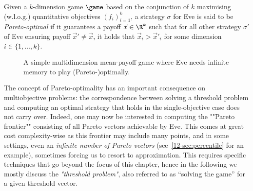 \begin{definition}
Given a $k$-dimension game $\game$ based on the conjunction of $k$ maximising (w.l.o.g.) quantitative objectives $(f_i)_{i=1}^{k}$, a strategy $\sigma$ for Eve is said to be \emph{Pareto-optimal} if it guarantees a payoff $\vec{x} \in \R^k$ such that for all other strategy $\sigma'$ of Eve ensuring payoff $\vec{x}' \neq \vec{x}$, it holds that $\vec{x}_i > \vec{x}'_i$ for some dimension $i \in \{1, \ldots, k\}$.
\end{definition}
 
  
\begin{figure}[tbp]
  \centering
  \caption{A simple multidimension mean-payoff game where Eve needs infinite memory to play (Pareto-)optimally.}
  \label{12-fig:MultiMP}
\end{figure}

The concept of Pareto-optimality has an important consequence on multiobjective problems: the correspondence between solving a threshold problem and computing an optimal strategy that holds in the single-objective case does not carry over. Indeed, one may now be interested in computing the ""Pareto frontier"" consisting of all Pareto  vectors achievable by Eve. This comes at great cost complexity-wise as this frontier may include many points, and in some settings, even an \emph{infinite number of Pareto vectors} (see~\cref{12-sec:percentile} for an example),  sometimes forcing us to resort to approximation. This requires specific techniques that go beyond the focus of this chapter, hence in the following we mostly discuss the \emph{"threshold problem"}, also referred to as ``solving the game'' for a given threshold vector.

